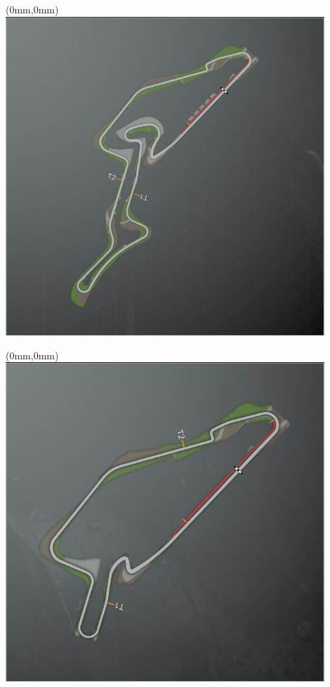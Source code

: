 \null\newpage
\begin{textblock*}{30mm}(0mm,0mm)%
\includegraphics[width=120mm]{TR/2015-05-20_00041.png}
\end{textblock*}
\null\newpage
\begin{textblock*}{30mm}(0mm,0mm)%
\includegraphics[width=120mm]{TR/2015-05-20_00044.png}
\end{textblock*}

